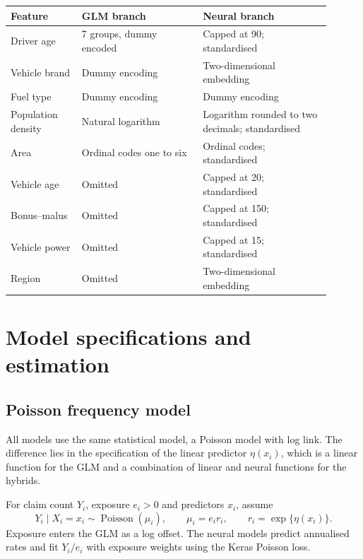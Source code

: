 \documentclass[a4paper]{article}
\begin{document}
\addvspace{\baselineskip}
\noindent
\begin{minipage}{\textwidth}
    \label{tab:features}
    \centering
    \small
\begin{tabular}{@{}p{0.20\linewidth}p{0.34\linewidth}p{0.36\linewidth}@{}}
\toprule
Feature & GLM branch & Neural branch\\
\midrule
Driver age & 7 groups, dummy encoded & Capped at 90; standardised\\
Vehicle brand & Dummy encoding & Two-dimensional embedding\\
Fuel type & Dummy encoding & Dummy encoding\\
Population \mbox{density} & Natural logarithm & Logarithm rounded to two decimals; standardised\\
Area & Ordinal codes one to six & Ordinal codes; standardised\\
Vehicle age & Omitted & Capped at 20; standardised\\
Bonus--malus & Omitted & Capped at 150; standardised\\
Vehicle power & Omitted & Capped at 15; standardised\\
Region & Omitted & Two-dimensional embedding\\
\bottomrule
\end{tabular}
\end{minipage}\par
\addvspace{\baselineskip}

\section{Model specifications and estimation}
\subsection{Poisson frequency model}
All models use the same statistical model, a Poisson model with log link.
The difference lies in the specification of the linear predictor $\eta(x_i)$, which is a linear function for the GLM and a combination of linear and neural functions for the hybrids.

For claim count $Y_i$, exposure $e_i>0$ and predictors $x_i$, assume
\[
 Y_i\mid X_i=x_i\sim\operatorname{Poisson}(\mu_i),\qquad
 \mu_i=e_i r_i,\qquad r_i=\exp\{\eta(x_i)\}.
\]
Exposure enters the GLM as a log offset.
The neural models predict annualised rates and fit $Y_i/e_i$ with
exposure weights using the Keras Poisson loss.
\end{document}
